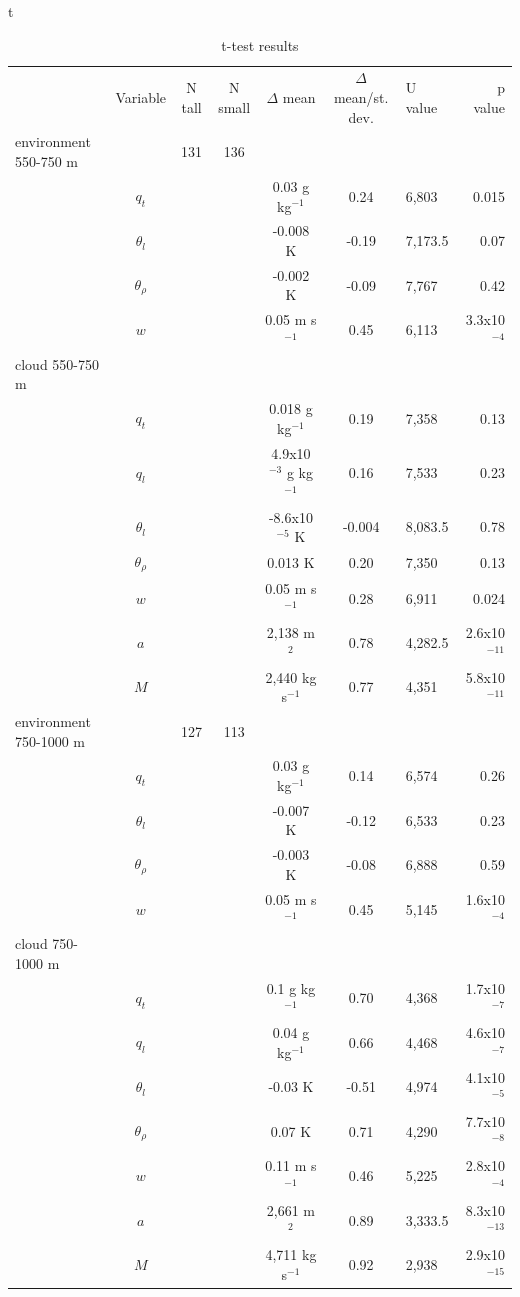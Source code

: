 \documentclass[acp]{copernicus}
\begin{document}
t
\begin{table}[t]
\label{tbl:mannwhitneyu}
\caption{t-test results}
\vskip4mm
\centering
\begin{tabular}{lccccclr}
\tophline
& Variable & N tall & N small & $\Delta$ mean & $\Delta$ mean/st. dev. & U value & p value\\
\middlehline
environment 550-750 m & & 131 & 136 & & & & \\
& $q_t$       & & &  0.03 g kg$^{-1}$          &  0.24 & 6,803   & 0.015    \\ 
& $\theta_l$ & & & -0.008 K                   & -0.19 & 7,173.5 & 0.07    \\
& $\theta_\rho$ & & & -0.002 K               & -0.09 & 7,767   & 0.42    \\
& $w$         & & &  0.05 m s$^{-1}$           &  0.45 & 6,113   & 3.3x10$^{-4}$ \\
cloud 550-750 m & & & & & & \\
& $q_t$       & & &  0.018 g kg$^{-1}$         &  0.19 & 7,358   & 0.13   \\
& $q_l$       & & &  4.9x10$^{-3}$ g kg$^{-1}$ &  0.16 & 7,533   & 0.23   \\
& $\theta_l$ & & & -8.6x10$^{-5}$ K           & -0.004 & 8,083.5 & 0.78 \\
& $\theta_\rho$ & & &  0.013 K               &  0.20 & 7,350   & 0.13  \\
& $w$         & & &  0.05 m s$^{-1}$           &  0.28 & 6,911   & 0.024  \\
& $a$         & & &  2,138 m$^2$                &  0.78 & 4,282.5 & 2.6x10$^{-11}$ \\
& $M$         & & &  2,440 kg s$^{-1}$    &  0.77 & 4,351 & 5.8x10$^{-11}$ \\
environment 750-1000 m & & 127 & 113 & & & & \\
& $q_t$       & & &  0.03 g kg$^{-1}$          &  0.14 & 6,574 & 0.26    \\
& $\theta_l$ & & & -0.007 K                   & -0.12 & 6,533 & 0.23    \\
& $\theta_\rho$ & & & -0.003 K               & -0.08 & 6,888 & 0.59    \\
& $w$         & & &  0.05 m s$^{-1}$           &  0.45 & 5,145 & 1.6x10$^{-4}$ \\
cloud 750-1000 m & & & & & &          \\
& $q_t$       & & &  0.1 g kg$^{-1}$           &  0.70 & 4,368   & 1.7x10$^{-7}$ \\
& $q_l$       & & &  0.04 g kg$^{-1}$          &  0.66 & 4,468   & 4.6x10$^{-7}$ \\
& $\theta_l$ & & & -0.03 K                    & -0.51 & 4,974   & 4.1x10$^{-5}$  \\
& $\theta_\rho$ & & &  0.07 K                &  0.71 & 4,290   & 7.7x10$^{-8}$ \\
& $w$         & & &  0.11 m s$^{-1}$           &  0.46 & 5,225   & 2.8x10$^{-4}$  \\
& $a$         & & &  2,661 m$^2$                &  0.89 & 3,333.5 & 8.3x10$^{-13}$ \\
& $M$         & & &  4,711 kg s$^{-1}$    &  0.92 & 2,938 & 2.9x10$^{-15}$ \\


\end{tabular}
\end{table}
\end{document}

